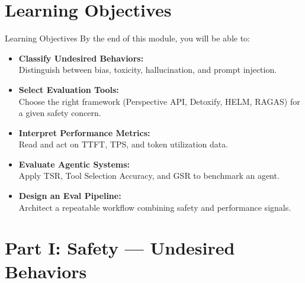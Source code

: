 \documentclass{beamer}       %
\begin{document}
\section{Learning Objectives}
\begin{frame}{Learning Objectives}
    \small
    By the end of this module, you will be able to:
    \begin{itemize}
        \item \textbf{Classify Undesired Behaviors:}\\
              Distinguish between bias, toxicity, hallucination, and prompt injection.
        \item \textbf{Select Evaluation Tools:}\\
              Choose the right framework (Perspective API, Detoxify, HELM, RAGAS) for a given safety concern.
        \item \textbf{Interpret Performance Metrics:}\\
              Read and act on TTFT, TPS, and token utilization data.
        \item \textbf{Evaluate Agentic Systems:}\\
              Apply TSR, Tool Selection Accuracy, and GSR to benchmark an agent.
        \item \textbf{Design an Eval Pipeline:}\\
              Architect a repeatable workflow combining safety and performance signals.
    \end{itemize}
\end{frame}

\section{Part I: Safety --- Undesired Behaviors}
\end{document}
